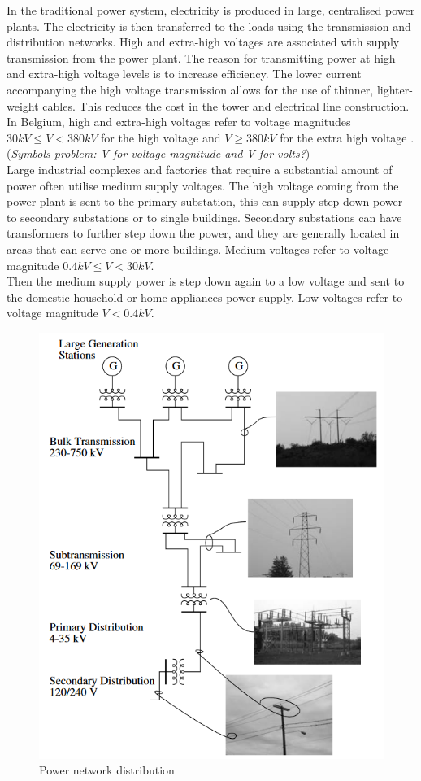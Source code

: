 In the traditional power system, electricity is produced in large, centralised power plants. The electricity is then transferred to the loads using the transmission and distribution networks. High and extra-high voltages are associated with supply transmission from the power plant. The reason for transmitting power at high and extra-high voltage levels is to increase efficiency. The lower current accompanying the high voltage transmission allows for the use of thinner, lighter-weight cables. This reduces the cost in the tower and electrical line construction. In Belgium, high and extra-high voltages refer to voltage magnitudes $30 kV \leq V < 380 kV$ for the high voltage and $V \geq 380 kV$ for the extra high voltage \cite{elia}. (\emph{Symbols problem: V for voltage magnitude and V for volts?})\\
Large industrial complexes and factories that require a substantial amount of power often utilise medium supply voltages. The high voltage coming from the power plant is sent to the primary substation, this can supply step-down power to secondary substations or to single buildings. Secondary substations can have transformers to further step down the power, and they are generally located in areas that can serve one or more buildings. Medium voltages refer to voltage magnitude $0.4 kV \leq V < 30 kV$. \\
Then the medium supply power is step down again to a low voltage and sent to the domestic household or home appliances power supply. Low voltages refer to voltage magnitude $V < 0.4 kV$. \\
\begin{figure}[H]
\centering
    \includegraphics[width=.25\linewidth]{images/Background/DN/DN.PNG}
\caption[Power network distribution]{Power network distribution \cite{EPD}}
\end{figure}


